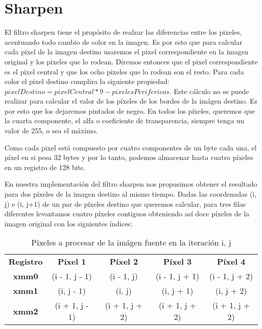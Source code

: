 \section{Sharpen}
El filtro sharpen tiene el propósito de realzar las diferencias entre los pixeles, acentuando todo cambio de color en la imagen. Es por esto que para calcular cada pixel de la imagen destino usaremos el pixel correspondiente en la imagen original y los pixeles que lo rodean. Diremos entonces que el pixel correspondiente es el pixel central y que los ocho pixeles que lo rodean son el resto. Para cada color el pixel destino cumplira la siguiente propiedad: $pixelDestino = pixelCentral * 9 - pixelesPerifericos$.
Este cálculo no se puede realizar para calcular el valor de los píxeles de los bordes de la imágen destino. Es por esto que los dejaremos pintados de negro.
En todos los píxeles, queremos que la cuarta componente, el alfa o coeficiente de transparencia, siempre tenga un valor de 255, o sea el máximo.

Como cada pixel está compuesto por cuatro componentes de un byte cada una, el píxel en si pesa 32 bytes y por lo tanto, podemos almacenar hasta cuatro píxeles en un registro de 128 bits.

En nuestra implementación del filtro sharpen nos propusimos obtener el resultado para dos píxeles de la imagen destino al mismo tiempo.
Dadas las coordenadas (i, j) e (i, j+1) de un par de  píxeles destino que queremos calcular, para tres filas diferentes levantamos cuatro píxeles contiguos obteniendo así doce píxeles de la imagen original con los siguientes índices: 

\begin{table}[h!]
  \begin{center}
    \caption{Píxeles a procesar de la imágen fuente en la iteración i, j}
    \label{tab:table1}
    \begin{tabular}{S|S|S|S|S}
      \textbf{Registro} & \textbf{Píxel 1} & \textbf{Píxel 2} & \textbf{Píxel 3} & \textbf{Píxel 4}\\
	\textbf{xmm0} & (i - 1, j - 1) & (i - 1, j) & (i - 1, j + 1) & (i - 1, j + 2)\\
	\textbf{xmm1} & (i, j - 1) & (i, j) & (i, j + 1) & (i, j + 2)\\
	\textbf{xmm2} & (i + 1, j - 1) & (i + 1, j + 2) & (i + 1, j + 2) & (i + 1, j + 2)\\
    \end{tabular}
  \end{center}
\end{table}

